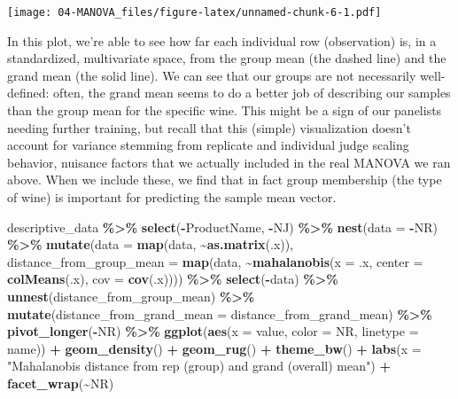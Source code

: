 \documentclass[
]{book}
\newenvironment{Shaded}{\begin{snugshade}}{\end{snugshade}}
\newcommand{\AttributeTok}[1]{\textcolor[rgb]{0.13,0.29,0.53}{#1}}
\newcommand{\FunctionTok}[1]{\textcolor[rgb]{0.13,0.29,0.53}{\textbf{#1}}}
\newcommand{\NormalTok}[1]{#1}
\newcommand{\SpecialCharTok}[1]{\textcolor[rgb]{0.81,0.36,0.00}{\textbf{#1}}}
\newcommand{\StringTok}[1]{\textcolor[rgb]{0.31,0.60,0.02}{#1}}
\begin{document}
\texttt{[image: 04-MANOVA\_files/figure-latex/unnamed-chunk-6-1.pdf]}

In this plot, we're able to see how far each individual row (observation) is, in a standardized, multivariate space, from the group mean (the dashed line) and the grand mean (the solid line). We can see that our groups are not necessarily well-defined: often, the grand mean seems to do a better job of describing our samples than the group mean for the specific wine. This might be a sign of our panelists needing further training, but recall that this (simple) visualization doesn't account for variance stemming from replicate and individual judge scaling behavior, nuisance factors that we actually included in the real MANOVA we ran above. When we include these, we find that in fact group membership (the type of wine) is important for predicting the sample mean vector.

\begin{Shaded}
\begin{Highlighting}[]
\NormalTok{descriptive\_data }\SpecialCharTok{\%\textgreater{}\%}
  \FunctionTok{select}\NormalTok{(}\SpecialCharTok{{-}}\NormalTok{ProductName, }\SpecialCharTok{{-}}\NormalTok{NJ) }\SpecialCharTok{\%\textgreater{}\%}
  \FunctionTok{nest}\NormalTok{(}\AttributeTok{data =} \SpecialCharTok{{-}}\NormalTok{NR) }\SpecialCharTok{\%\textgreater{}\%}
  \FunctionTok{mutate}\NormalTok{(}\AttributeTok{data =} \FunctionTok{map}\NormalTok{(data, }\SpecialCharTok{\textasciitilde{}}\FunctionTok{as.matrix}\NormalTok{(.x)), }
         \AttributeTok{distance\_from\_group\_mean =} \FunctionTok{map}\NormalTok{(data, }\SpecialCharTok{\textasciitilde{}}\FunctionTok{mahalanobis}\NormalTok{(}\AttributeTok{x =}\NormalTok{ .x, }\AttributeTok{center =} \FunctionTok{colMeans}\NormalTok{(.x), }\AttributeTok{cov =} \FunctionTok{cov}\NormalTok{(.x)))) }\SpecialCharTok{\%\textgreater{}\%}
  \FunctionTok{select}\NormalTok{(}\SpecialCharTok{{-}}\NormalTok{data) }\SpecialCharTok{\%\textgreater{}\%}
  \FunctionTok{unnest}\NormalTok{(distance\_from\_group\_mean) }\SpecialCharTok{\%\textgreater{}\%}
  \FunctionTok{mutate}\NormalTok{(}\AttributeTok{distance\_from\_grand\_mean =}\NormalTok{ distance\_from\_grand\_mean) }\SpecialCharTok{\%\textgreater{}\%}
  \FunctionTok{pivot\_longer}\NormalTok{(}\SpecialCharTok{{-}}\NormalTok{NR) }\SpecialCharTok{\%\textgreater{}\%}
  \FunctionTok{ggplot}\NormalTok{(}\FunctionTok{aes}\NormalTok{(}\AttributeTok{x =}\NormalTok{ value, }\AttributeTok{color =}\NormalTok{ NR, }\AttributeTok{linetype =}\NormalTok{ name)) }\SpecialCharTok{+}
  \FunctionTok{geom\_density}\NormalTok{() }\SpecialCharTok{+}
  \FunctionTok{geom\_rug}\NormalTok{() }\SpecialCharTok{+}
  \FunctionTok{theme\_bw}\NormalTok{() }\SpecialCharTok{+}
  \FunctionTok{labs}\NormalTok{(}\AttributeTok{x =} \StringTok{"Mahalanobis distance from rep (group) and grand (overall) mean"}\NormalTok{) }\SpecialCharTok{+}
  \FunctionTok{facet\_wrap}\NormalTok{(}\SpecialCharTok{\textasciitilde{}}\NormalTok{NR)}
\end{Highlighting}
\end{Shaded}
\end{document}
